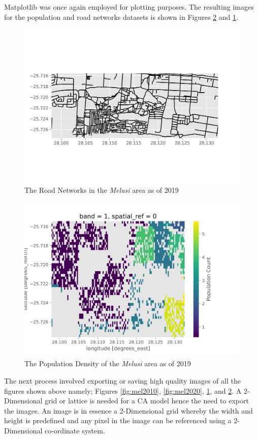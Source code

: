 Matplotlib was once again employed for plotting purposes. The resulting images for the population and road networks datasets is shown in Figures \ref{fig:popgraph} and \ref{fig:roadgraph}.
\begin{figure}[H]
\centering
\includegraphics[width=1\textwidth]{Figures/Chapter3/Roads2019}
\caption{The Road Networks in the \textit{Melusi} area as of 2019}
\label{fig:roadgraph}
\end{figure}
\begin{figure}[H]
\centering
\includegraphics[width=1\textwidth]{Figures/Chapter3/Population2019}
\caption{The Population Density of the \textit{Melusi} area as of 2019}
\label{fig:popgraph}
\end{figure}
The next process involved exporting or saving high quality images of all the figures shown above namely; Figures \ref{fig:mel2010}, \ref{fig:mel2020}, \ref{fig:roadgraph}, and \ref{fig:popgraph}. A 2-Dimensional grid or lattice is needed for a CA model hence the need to export the images. An image is in essence a 2-Dimensional grid whereby the width and height is predefined and any pixel in the image can be referenced using a 2-Dimensional co-ordinate system.

